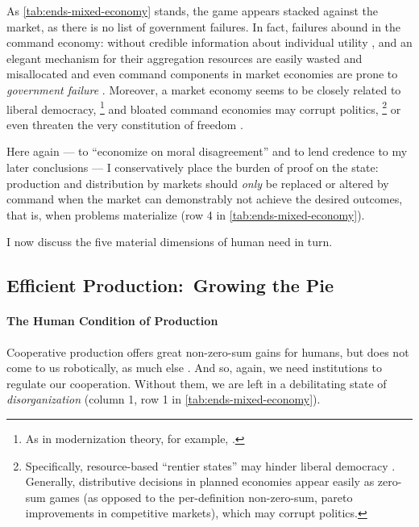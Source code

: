 As \autoref{tab:ends-mixed-economy} stands, the game appears stacked against the market, as there is no list of government failures.
In fact, failures abound in the command economy:
without credible information about individual utility \citep[confer][]{Hayek1931}, and an elegant mechanism for their aggregation  \citep[confer][]{Lerner1944, Lange1934, Debreu1954} resources are easily wasted and misallocated and even command components in market economies are prone to \emph{government failure} \citep{Coase1964}.
Moreover, a market economy seems to be closely related to liberal democracy,
\footnote{
	As in modernization theory, for example, \cite{InglehartWelzel-2005-aa}.
}
and bloated command economies may corrupt politics,
\footnote{
	Specifically, resource-based ``rentier states'' may hinder liberal democracy \citep{Beblawi1990}.
	Generally, distributive decisions in planned economies appear easily as zero-sum games (as opposed to the per-definition non-zero-sum, pareto improvements in competitive markets), which may corrupt politics.
}
or even threaten the very constitution of freedom \citep{Hayek1944, Friedman1962}.

Here again --- to ``economize on moral disagreement'' \citep[K226]{GutmannThompson-2004-aa} and to lend credence to my later conclusions --- I conservatively place the burden of proof on the state:
production and distribution by markets should \emph{only} be replaced or altered by command when the market can demonstrably not achieve the desired outcomes, that is, when problems materialize (row 4 in \autoref{tab:ends-mixed-economy}).

I now discuss the five material dimensions of human need in turn.

\subsection[Efficient Production]{Efficient Production:\ Growing the Pie}
	\label{sec:production}

\paragraph{The Human Condition of Production}
	\label{sec:human-nature-of-production}
Cooperative production offers great non-zero-sum gains for humans, but does not come to us robotically, as much else \citep{Wilson2012}.
And so, again, we need institutions to regulate our cooperation.
Without them, we are left in a debilitating state of \emph{disorganization} (column 1, row 1 in \autoref{tab:ends-mixed-economy}).

